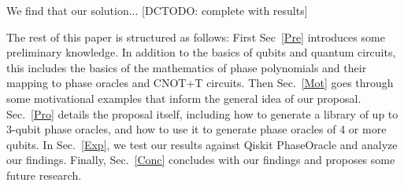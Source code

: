 We find that our solution... [DCTODO: complete with results]

The rest of this paper is structured as follows: First Sec~\ref{Pre}
introduces some preliminary knowledge. In addition to the basics of
qubits and quantum circuits, this includes the basics of the
mathematics of phase polynomials and their mapping to phase oracles
and CNOT+T circuits. Then Sec.~\ref{Mot} goes through some
motivational examples that inform the general idea of our proposal.
Sec.~\ref{Pro} details the proposal itself, including how to
generate a library of up to 3-qubit phase oracles, and how to use
it to generate phase oracles of 4 or more qubits. In Sec.~\ref{Exp},
we test our results against Qiskit PhaseOracle and analyze our
findings. Finally, Sec.~\ref{Conc} concludes with our findings and
proposes some future research.

